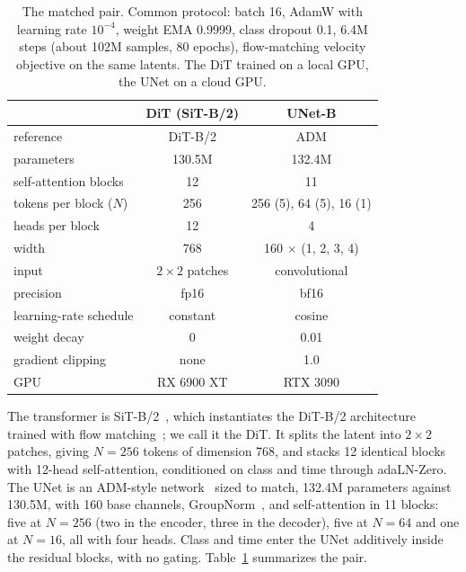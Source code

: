 \documentclass{article}
\begin{document}
\begin{table}[t]
  \caption{The matched pair. Common protocol: batch 16, AdamW with learning rate $10^{-4}$, weight EMA 0.9999, class dropout 0.1, 6.4M steps (about 102M samples, 80 epochs), flow-matching velocity objective on the same latents. The DiT trained on a local GPU, the UNet on a cloud GPU.}
  \label{tab:models}
  \centering
  \begin{small}
    \setlength{\tabcolsep}{2pt}
    \begin{tabular}{lcc}
      \toprule
       & DiT (SiT-B/2) & UNet-B \\
      \midrule
      reference & DiT-B/2 & ADM \\
      parameters & 130.5M & 132.4M \\
      self-attention blocks & 12 & 11 \\
      tokens per block ($N$) & 256 & 256 (5), 64 (5), 16 (1) \\
      heads per block & 12 & 4 \\
      width & 768 & 160 ${\times}$ (1, 2, 3, 4) \\
      input & $2{\times}2$ patches & convolutional \\
      \midrule
      precision & fp16 & bf16 \\
      learning-rate schedule & constant & cosine \\
      weight decay & 0 & 0.01 \\
      gradient clipping & none & 1.0 \\
      GPU & RX 6900 XT & RTX 3090 \\
      \bottomrule
    \end{tabular}
  \end{small}
  \vspace{-0.3cm}
\end{table}

The transformer is SiT-B/2~\cite{ma2024sit}, which instantiates the DiT-B/2 architecture~\cite{peebles2023scalable} trained with flow matching~\cite{lipman2023flow}; we call it the DiT. It splits the latent into $2{\times}2$ patches, giving $N{=}256$ tokens of dimension 768, and stacks 12 identical blocks with 12-head self-attention, conditioned on class and time through adaLN-Zero. The UNet is an ADM-style network~\cite{dhariwal2021diffusion} sized to match, 132.4M parameters against 130.5M, with 160 base channels, GroupNorm~\cite{wu2018group}, and self-attention in 11 blocks: five at $N{=}256$ (two in the encoder, three in the decoder), five at $N{=}64$ and one at $N{=}16$, all with four heads. Class and time enter the UNet additively inside the residual blocks, with no gating. Table~\ref{tab:models} summarizes the pair.
\end{document}
